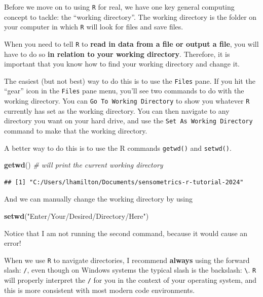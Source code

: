 \documentclass[
]{book}
\newenvironment{Shaded}{\begin{snugshade}}{\end{snugshade}}
\newcommand{\CommentTok}[1]{\textcolor[rgb]{0.56,0.35,0.01}{\textit{#1}}}
\newcommand{\FunctionTok}[1]{\textcolor[rgb]{0.13,0.29,0.53}{\textbf{#1}}}
\newcommand{\NormalTok}[1]{#1}
\newcommand{\StringTok}[1]{\textcolor[rgb]{0.31,0.60,0.02}{#1}}
\begin{document}
Before we move on to using \texttt{R} for real, we have one key general computing concept to tackle: the ``working directory''. The working directory is the folder on your computer in which \texttt{R} will look for files and save files.

When you need to tell \texttt{R} to \textbf{read in data from a file or output a file}, you will have to do so \textbf{in relation to your working directory}. Therefore, it is important that you know how to find your working directory and change it.

The easiest (but not best) way to do this is to use the \texttt{Files} pane. If you hit the ``gear'' icon in the \texttt{Files} pane menu, you'll see two commands to do with the working directory. You can \texttt{Go\ To\ Working\ Directory} to show you whatever \texttt{R} currently has set as the working directory. You can then navigate to any directory you want on your hard drive, and use the \texttt{Set\ As\ Working\ Directory} command to make that the working directory.

A better way to do this is to use the R commands \texttt{getwd()} and \texttt{setwd()}.

\begin{Shaded}
\begin{Highlighting}[]
\FunctionTok{getwd}\NormalTok{() }\CommentTok{\# will print the current working directory}
\end{Highlighting}
\end{Shaded}

\begin{verbatim}
## [1] "C:/Users/lhamilton/Documents/sensometrics-r-tutorial-2024"
\end{verbatim}

And we can manually change the working directory by using

\begin{Shaded}
\begin{Highlighting}[]
\FunctionTok{setwd}\NormalTok{(}\StringTok{"Enter/Your/Desired/Directory/Here"}\NormalTok{)}
\end{Highlighting}
\end{Shaded}

Notice that I am not running the second command, because it would cause an error!

When we use \texttt{R} to navigate directories, I recommend \textbf{always} using the forward slash: \texttt{/}, even though on Windows systems the typical slash is the backslash: \texttt{\textbackslash{}}. \texttt{R} will properly interpret the \texttt{/} for you in the context of your operating system, and this is more consistent with most modern code environments.
\end{document}
